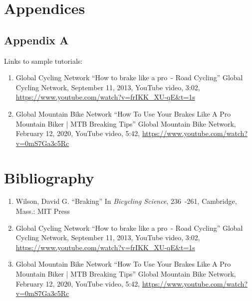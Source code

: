\documentclass[12pt, a4]{article}
\begin{document}
\section{Appendices}
\subsection{Appendix A}
Links to sample tutorials:
\begin{enumerate}
\item Global Cycling Network ``How to brake like a pro~- Road Cycling'' Global Cycling Network, September 11, 2013, YouTube video, 3:02, \url{https://www.youtube.com/watch?v=frIKK_XU-qE&t=1s}
\item Global Mountain Bike Network ``How To Use Your Brakes Like A Pro Mountain Biker | MTB Breaking Tips'' Global Mountain Bike Network, February 12, 2020, YouTube video, 5:42, \url{https://www.youtube.com/watch?v=0mS7Ga3c5Rc}
\end{enumerate}
\section{Bibliography}
\begin{enumerate}
\item{Wilson, David G. ``Braking'' In \textit{Bicycling Science}, 236~-261, Cambridge, Mass.: MIT Press}
\item Global Cycling Network ``How to brake like a pro~- Road Cycling'' Global Cycling Network, September 11, 2013, YouTube video, 3:02, \url{https://www.youtube.com/watch?v=frIKK_XU-qE&t=1s}
\item Global Mountain Bike Network ``How To Use Your Brakes Like A Pro Mountain Biker | MTB Breaking Tips'' Global Mountain Bike Network, February 12, 2020, YouTube video, 5:42, \url{https://www.youtube.com/watch?v=0mS7Ga3c5Rc}
\end{enumerate}
\end{document}
